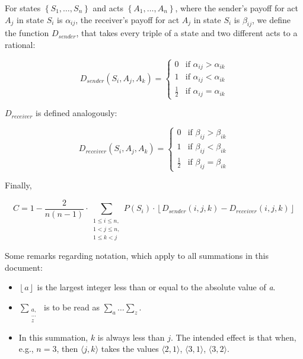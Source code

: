 \documentclass{article}
\begin{document}
For states $\left\{S_{1},\dots,S_{n}\right\}$ and acts
$\left\{A_{1},\dots,A_{n}\right\}$, where the sender's payoff for act
$A_j$ in state $S_i$ is $\alpha_{ij}$, the receiver's payoff for act
$A_j$ in state $S_i$ is $\beta_{ij}$, we define the function
$D_{sender}$, that takes every triple of a state and two different acts
to a rational:

\[D_{sender}\left(S_i, A_j, A_k\right) = \begin{cases}
    0 & \mbox{if } \alpha_{ij} > \alpha_{ik} \\
    1 & \mbox{if } \alpha_{ij} < \alpha_{ik} \\
    \frac{1}{2} & \mbox{if } \alpha_{ij} = \alpha_{ik}
    \end{cases}\]

$D_{receiver}$ is defined analogously:

\[D_{receiver}\left(S_i, A_j, A_k\right) = \begin{cases}
    0 & \mbox{if } \beta_{ij} > \beta_{ik} \\
    1 & \mbox{if } \beta_{ij} < \beta_{ik} \\
    \frac{1}{2} & \mbox{if } \beta_{ij} = \beta_{ik}
    \end{cases}\]

Finally,

\[C = 1 - \frac{2}{n(n-1)}\cdot \sum\limits_{\substack{1 \leq i \leq n, \\ 1 < j \leq n, \\ 1 \leq k < j}} P\left(S_{i}\right)\cdot\left\lfloor D_{sender}(i, j, k) - D_{receiver}(i,j,k)\right\rfloor\]

Some remarks regarding notation, which apply to all summations in this document:
\begin{itemize}

\item $\left\lfloor a \right\rfloor$ is the largest integer less than or equal to the absolute value of \emph{a}. 

\item $\sum\limits_{\substack{a, \\ \ldots \\ z}}$ is to be read as $\sum\limits_{a}  \ldots \sum\limits_{ z}$. 

\item In this summation, $k$ is always less than $j$. The intended effect is that when, e.g., $n=3$, then $\langle j,k \rangle$ takes the values $\langle 2,1 \rangle$, $\langle 3,1 \rangle$, $\langle 3,2 \rangle$. 

    \end{itemize}
\end{document}
